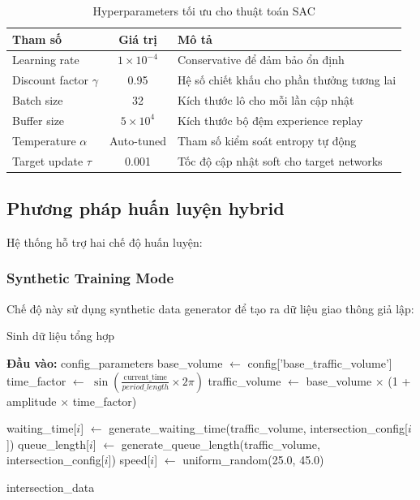 \begin{table}[!htp]
\centering
\caption{Hyperparameters tối ưu cho thuật toán SAC}
\label{tab:sac_hyperparameters}
\begin{tabular}{|l|c|p{5cm}|}
\hline
\textbf{Tham số} & \textbf{Giá trị} & \textbf{Mô tả} \\
\hline
Learning rate & $1 \times 10^{-4}$ & Conservative để đảm bảo ổn định \\
\hline
Discount factor $\gamma$ & 0.95 & Hệ số chiết khấu cho phần thưởng tương lai \\
\hline
Batch size & 32 & Kích thước lô cho mỗi lần cập nhật \\
\hline
Buffer size & $5 \times 10^{4}$ & Kích thước bộ đệm experience replay \\
\hline
Temperature $\alpha$ & Auto-tuned & Tham số kiểm soát entropy tự động \\
\hline
Target update $\tau$ & 0.001 & Tốc độ cập nhật soft cho target networks \\
\hline
\end{tabular}
\end{table}

\subsection{Phương pháp huấn luyện hybrid}
Hệ thống hỗ trợ hai chế độ huấn luyện:

\subsubsection{Synthetic Training Mode}
Chế độ này sử dụng synthetic data generator để tạo ra dữ liệu giao thông giả lập:

\begin{algorithm}[!htp]
    \caption{Sinh dữ liệu tổng hợp}
    \begin{algorithmic}[1]
        \State \textbf{Đầu vào:} config\_parameters
        \State base\_volume $\leftarrow$ config['base\_traffic\_volume'] 
        \State time\_factor $\leftarrow$ $\sin(\frac{\text{current\_time}}{period\_length} \times 2\pi)$
        \State traffic\_volume $\leftarrow$ base\_volume $\times$ (1 + amplitude $\times$ time\_factor) 
        
            \State waiting\_time[$i$] $\leftarrow$ generate\_waiting\_time(traffic\_volume, intersection\_config[$i$])
            \State queue\_length[$i$] $\leftarrow$ generate\_queue\_length(traffic\_volume, intersection\_config[$i$])
            \State speed[$i$] $\leftarrow$ uniform\_random(25.0, 45.0) 
        \EndFor 
        
        \State \Return intersection\_data
    \end{algorithmic}
\end{algorithm}

